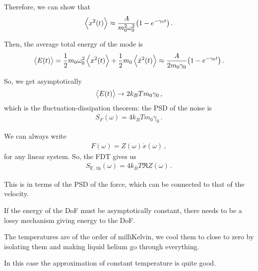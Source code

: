\documentclass[main.tex]{subfiles}
\begin{document}
Therefore, we can show that 
%
\begin{align}
\expval{x^2(t)} \approx \frac{A}{m_0^2 \omega_0^2} \qty(1 - e^{- \gamma_0 t})
\,.
\end{align}

Then, the average total energy of the mode is 
%
\begin{align}
\expval{E(t)} 
= \frac{1}{2} m_0 \omega_0^2 \expval{x^2(t)} + \frac{1}{2} m_0 \expval{\dot{x}^2(t)}
\approx \frac{A}{2 m_0 \gamma_0 } \qty(1 - e^{-\gamma_0 t})
\,.
\end{align}

So, we get asymptotically 
%
\begin{align}
\expval{E(t)} \to 2 k_B T m_0 \gamma_0 
\,,
\end{align}
%
which is the fluctuation-dissipation theorem: the PSD of the noise is 
%
\begin{align}
S_F(\omega ) = 4 k_B T m_0 \gamma_0 
\,.
\end{align}

We can always write 
%
\begin{align}
F(\omega ) = Z(\omega ) \dot{x}(\omega )
\,,
\end{align}
%
for any linear system.
So, the FDT gives us 
%
\begin{align}
S _{\text{F, th}} (\omega ) = 4 k_B T \Re{Z(\omega )}
\,.
\end{align}

This is in terms of the PSD of the force, which can be connected to that of the velocity.

If the energy of the DoF must be asymptotically constant, there needs to be a lossy mechanism giving energy to the DoF. 


The temperatures are of the order of milliKelvin, we cool them to close to zero by isolating them and making liquid helium go through everything. 

In this case the approximation of constant temperature is quite good.
\end{document}
